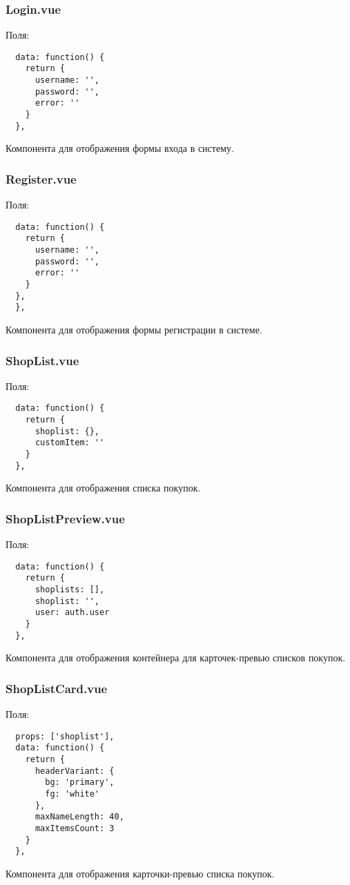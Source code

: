 \subsubsection{Login.vue}
Поля:
\begin{verbatim}
  data: function() {
    return {
      username: '',
      password: '',
      error: ''
    }
  },
\end{verbatim}
Компонента для отображения формы входа в систему.

\subsubsection{Register.vue}
Поля:
\begin{verbatim}
  data: function() {
    return {
      username: '',
      password: '',
      error: ''
    }
  },
  },
\end{verbatim}
Компонента для отображения формы регистрации в системе.

\subsubsection{ShopList.vue}
Поля:
\begin{verbatim}
  data: function() {
    return {
      shoplist: {},
      customItem: ''
    }
  },
\end{verbatim}
Компонента для отображения списка покупок.

\subsubsection{ShopListPreview.vue}
Поля:
\begin{verbatim}
  data: function() {
    return {
      shoplists: [],
      shoplist: '',
      user: auth.user
    }
  },
\end{verbatim}
Компонента для отображения контейнера для карточек-превью списков покупок.

\subsubsection{ShopListCard.vue}
Поля:
\begin{verbatim}
  props: ['shoplist'],
  data: function() {
    return {
      headerVariant: {
        bg: 'primary',
        fg: 'white'
      },
      maxNameLength: 40,
      maxItemsCount: 3
    }
  },
\end{verbatim}
Компонента для отображения карточки-превью списка покупок.

